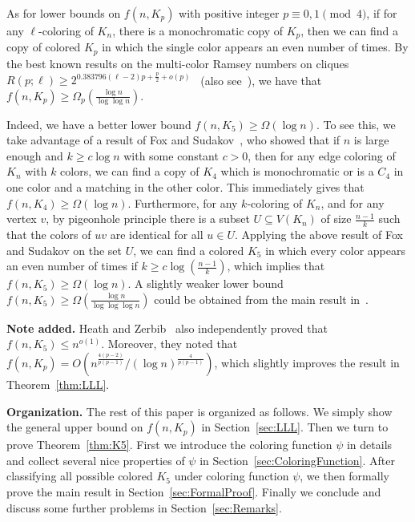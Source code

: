 \documentclass[11pt]{article}
\theoremstyle{definition}
\begin{document}
As for lower bounds on $f(n,K_{p})$ with positive integer $p\equiv 0,1\pmod{4}$, if for any $\ell$-coloring of $K_{n}$, there is a monochromatic copy of $K_{p}$, then we can find a copy of colored $K_{p}$ in which the single color appears an even number of times. By the best known results on the multi-color Ramsey numbers on cliques $R(p;\ell)\ge 2^{0.383796(\ell-2)p+\frac{p}{2}+o(p)}$~\cite{2022JCTASawin} (also see~\cite{2021ADVConlonFerber,2021PAMSWigderson}), we have that $f(n,K_{p})\ge\Omega_{p}(\frac{\log{n}}{\log{\log{n}}})$. 

Indeed, we have a better lower bound $f(n,K_{5})\ge\Omega(\log{n})$. To see this, we take advantage of a result of Fox and Sudakov~\cite{2008SIAMFoxSudakov}, who showed that if $n$ is large enough and $k\ge c\log{n}$ with some constant $c>0$, then for any edge coloring of $K_{n}$ with $k$ colors, we can find a copy of $K_{4}$ which is monochromatic or is a $C_{4}$ in one color and a matching in the other color. This immediately gives that $f(n,K_{4})\ge\Omega(\log{n})$. Furthermore, for any $k$-coloring of $K_{n}$, and for any vertex $v$, by pigeonhole principle there is a subset $U\subseteq V(K_{n})$ of size $\frac{n-1}{k}$ such that the colors of $uv$ are identical for all $u\in U$. Applying the above result of Fox and Sudakov on the set $U$, we can find a colored $K_{5}$ in which every color appears an even number of times if $k\ge c\log{(\frac{n-1}{k})}$, which implies that $f(n,K_{5})\ge\Omega(\log{n})$. A slightly weaker lower bound $f(n,K_{5})\ge\Omega(\frac{\log{n}}{\log{\log{\log{n}}}})$ could be obtained from the main result in~\cite{2008CPCMubayi}.

\medskip

\noindent\textbf{Note added.} Heath and Zerbib~\cite{2023Emily} also independently proved that $f(n,K_{5})\le n^{o(1)}$. Moreover, they noted that $f(n,K_{p})=O(n^{\frac{4(p-2)}{p(p-1)}}/(\log{n})^{\frac{4}{p(p-1)}})$, which slightly improves the result in Theorem~\ref{thm:LLL}.

\medskip

\noindent\textbf{Organization.} The rest of this paper is organized as follows. We simply show the general upper bound on $f(n,K_{p})$ in Section~\ref{sec:LLL}. Then we turn to prove Theorem~\ref{thm:K5}. First we introduce the coloring function $\psi$ in details and collect several nice properties of $\psi$ in Section~\ref{sec:ColoringFunction}. After classifying all possible colored $K_{5}$ under coloring function $\psi$, we then formally prove the main result in Section~\ref{sec:FormalProof}. Finally we conclude and discuss some further problems in Section~\ref{sec:Remarks}.\\
\end{document}
